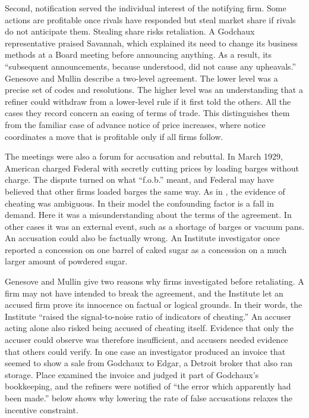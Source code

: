 Second, notification served the individual interest of the notifying firm. Some actions are profitable once
rivals have responded but steal market share if rivals do not anticipate them. Stealing share risks retaliation.
A Godchaux representative praised Savannah, which explained its need to change its business methods at a Board
meeting before announcing anything. As a result, its ``subsequent announcements, because understood, did not
cause any upheavals.'' Genesove and Mullin describe a two-level agreement. The lower level was a precise set of codes and
resolutions. The higher level was an understanding that a refiner could withdraw from a lower-level rule if it
first told the others. All the cases they record concern an easing of terms of trade. This distinguishes them
from the familiar case of advance notice of price increases, where notice coordinates a move that is profitable
only if all firms follow.

The meetings were also a forum for accusation and rebuttal. In March 1929, American charged Federal with secretly
cutting prices by loading barges without charge. The dispute turned on what ``f.o.b.'' meant, and Federal
may have believed that other firms loaded barges the same way. As in \citet{GreenPorter1984}, the evidence of
cheating was ambiguous. In their model the confounding factor is a fall in demand. Here it was a
misunderstanding about the terms of the agreement. In other cases it was an
external event, such as a shortage of barges or vacuum pans. An accusation could also be factually wrong. An
Institute investigator once reported a concession on one barrel of caked sugar as a concession on a much larger
amount of powdered sugar.

Genesove and Mullin give two reasons why firms investigated before retaliating. A firm may not have intended to
break the agreement, and the Institute let an accused firm prove its innocence on factual or logical grounds. In
their words, the Institute ``raised the signal-to-noise ratio of indicators of cheating.'' An accuser acting alone
also risked being accused of cheating itself. Evidence that only the accuser could observe was therefore
insufficient, and accusers needed evidence that others could verify. In one case an investigator produced an invoice that seemed to show a sale
from Godchaux to Edgar, a Detroit broker that also ran storage. Place examined the invoice and judged it part of
Godchaux's bookkeeping, and the refiners were notified of ``the error which apparently had been made.''
 below shows why lowering the rate of false accusations relaxes the incentive
constraint.

